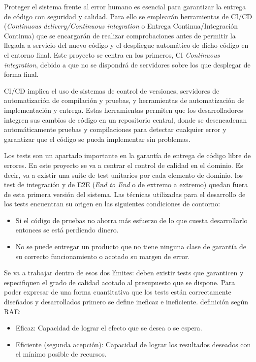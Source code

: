 
Proteger el sistema frente al error humano es esencial para garantizar la entrega de código con seguridad y calidad.
Para ello se emplearán herramientas de \gls{CI/CD} (\textit{Continuous delivery/Continuous integration} o Entrega Continua/Integración Continua) que se encargarán de realizar comprobaciones antes de permitir la llegada a servicio del nuevo código y el despliegue automático de dicho código en el entorno final.
Este proyecto se centra en los primeros, CI \textit{Continuous integration}, debido a que no se dispondrá de servidores sobre los que desplegar de forma final.

CI/CD implica el uso de sistemas de control de versiones, servidores de automatización de compilación y pruebas, y herramientas de automatización de implementación y entrega.
Estas herramientas permiten que los desarrolladores integren sus cambios de código en un repositorio central, donde se desencadenan automáticamente pruebas y compilaciones para detectar cualquier error y garantizar que el código se pueda implementar sin problemas.

Los tests son un apartado importante en la garantía de entrega de código libre de errores.
En este proyecto se va a centrar el control de calidad en el dominio.
Es decir, va a existir una suite de test unitarios por cada elemento de dominio.
los test de integración y de \gls{E2E} (\textit{End to End} o de extremo a extremo) quedan fuera de esta primera versión del sistema.
Las técnicas utilizadas para el desarrollo de los tests encuentran su origen en las siguientes condiciones de contorno:

\begin{itemize}
    \item Si el código de pruebas no ahorra más esfuerzo de lo que cuesta desarrollarlo entonces se está perdiendo dinero.
    \item No se puede entregar un producto que no tiene ninguna clase de garantía de su correcto funcionamiento o acotado su margen de error.
\end{itemize}

Se va a trabajar dentro de esos dos límites: deben existir tests que garanticen y especifiquen el grado de calidad acotado al presupuesto que se dispone.
Para poder expresar de una forma cuantitativa que los tests están correctamente diseñados y desarrollados primero se define ineficaz e ineficiente.
definición según RAE:

\begin{itemize}
    \item Eficaz: Capacidad de lograr el efecto que se desea o se espera.
    \item Eficiente (segunda acepción): Capacidad de lograr los resultados deseados con el mínimo posible de recursos.
\end{itemize}

